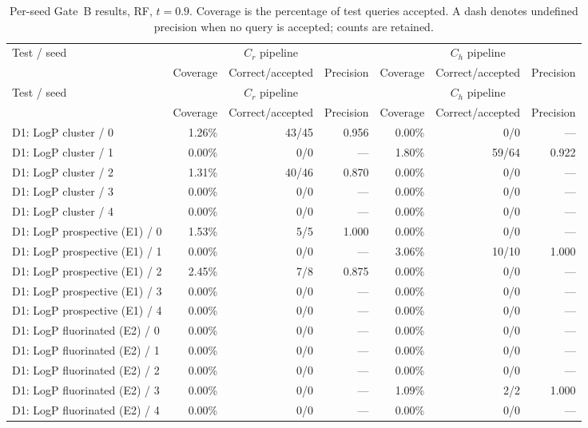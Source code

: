 \begin{longtable}{@{}lrrrrrr@{}}
\caption{Per-seed Gate~B results, RF, $t=0.9$. Coverage is the percentage of test queries accepted. A dash denotes undefined precision when no query is accepted; counts are retained.}\\
\toprule
Test / seed & \multicolumn{3}{c}{$C_r$ pipeline} & \multicolumn{3}{c}{$C_h$ pipeline} \\
 & Coverage & Correct/accepted & Precision & Coverage & Correct/accepted & Precision \\
\midrule
\endfirsthead
\toprule
Test / seed & \multicolumn{3}{c}{$C_r$ pipeline} & \multicolumn{3}{c}{$C_h$ pipeline} \\
 & Coverage & Correct/accepted & Precision & Coverage & Correct/accepted & Precision \\
\midrule
\endhead
\bottomrule
\endfoot
D1: LogP cluster / 0 & 1.26\% & 43/45 & 0.956 & 0.00\% & 0/0 & --- \\
D1: LogP cluster / 1 & 0.00\% & 0/0 & --- & 1.80\% & 59/64 & 0.922 \\
D1: LogP cluster / 2 & 1.31\% & 40/46 & 0.870 & 0.00\% & 0/0 & --- \\
D1: LogP cluster / 3 & 0.00\% & 0/0 & --- & 0.00\% & 0/0 & --- \\
D1: LogP cluster / 4 & 0.00\% & 0/0 & --- & 0.00\% & 0/0 & --- \\
\addlinespace
D1: LogP prospective (E1) / 0 & 1.53\% & 5/5 & 1.000 & 0.00\% & 0/0 & --- \\
D1: LogP prospective (E1) / 1 & 0.00\% & 0/0 & --- & 3.06\% & 10/10 & 1.000 \\
D1: LogP prospective (E1) / 2 & 2.45\% & 7/8 & 0.875 & 0.00\% & 0/0 & --- \\
D1: LogP prospective (E1) / 3 & 0.00\% & 0/0 & --- & 0.00\% & 0/0 & --- \\
D1: LogP prospective (E1) / 4 & 0.00\% & 0/0 & --- & 0.00\% & 0/0 & --- \\
\addlinespace
D1: LogP fluorinated (E2) / 0 & 0.00\% & 0/0 & --- & 0.00\% & 0/0 & --- \\
D1: LogP fluorinated (E2) / 1 & 0.00\% & 0/0 & --- & 0.00\% & 0/0 & --- \\
D1: LogP fluorinated (E2) / 2 & 0.00\% & 0/0 & --- & 0.00\% & 0/0 & --- \\
D1: LogP fluorinated (E2) / 3 & 0.00\% & 0/0 & --- & 1.09\% & 2/2 & 1.000 \\
D1: LogP fluorinated (E2) / 4 & 0.00\% & 0/0 & --- & 0.00\% & 0/0 & --- \\

\end{longtable}
